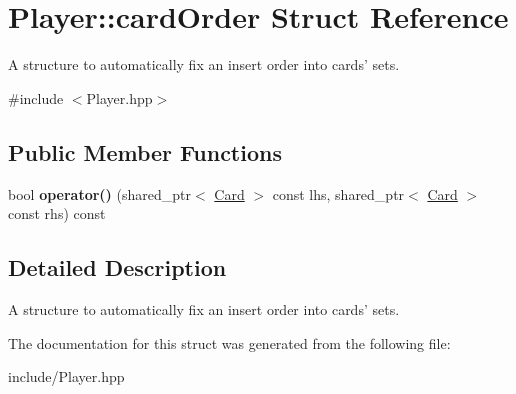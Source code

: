 \hypertarget{structPlayer_1_1cardOrder}{\section{\-Player\-:\-:card\-Order \-Struct \-Reference}
\label{structPlayer_1_1cardOrder}
}


\-A structure to automatically fix an insert order into cards' sets.  




{\ttfamily \#include $<$\-Player.\-hpp$>$}

\subsection*{\-Public \-Member \-Functions}
\begin{DoxyCompactItemize}
\item 
\hypertarget{structPlayer_1_1cardOrder_a1992ec2fb8b64e0749dcbbf997a56846}{bool {\bfseries operator()} (shared\-\_\-ptr$<$ \hyperlink{classCard}{\-Card} $>$ const lhs, shared\-\_\-ptr$<$ \hyperlink{classCard}{\-Card} $>$ const rhs) const }\label{structPlayer_1_1cardOrder_a1992ec2fb8b64e0749dcbbf997a56846}

\end{DoxyCompactItemize}


\subsection{\-Detailed \-Description}
\-A structure to automatically fix an insert order into cards' sets. 

\-The documentation for this struct was generated from the following file\-:\begin{DoxyCompactItemize}
\item 
include/\-Player.\-hpp\end{DoxyCompactItemize}
